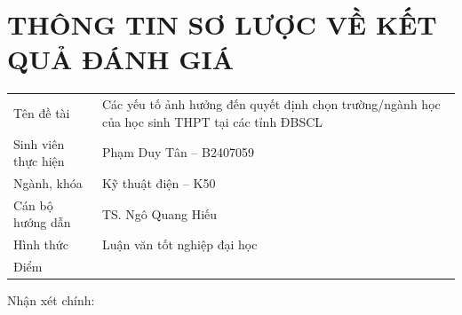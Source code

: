 \chapter*{THÔNG TIN SƠ LƯỢC VỀ KẾT QUẢ ĐÁNH GIÁ}
\noindent\begin{tabularx}{\textwidth}{p{5.2cm}X}
Tên đề tài & Các yếu tố ảnh hưởng đến quyết định chọn trường/ngành học của học sinh THPT tại các tỉnh ĐBSCL\\
Sinh viên thực hiện & Phạm Duy Tân -- B2407059\\
Ngành, khóa & Kỹ thuật điện -- K50\\
Cán bộ hướng dẫn & TS. Ngô Quang Hiếu\\
Hình thức & Luận văn tốt nghiệp đại học\\
Điểm & \dotfill\\
\end{tabularx}
\vspace{1cm}\noindent Nhận xét chính: \dotfill\\[0.5cm]\dotfill\\[0.5cm]\dotfill
